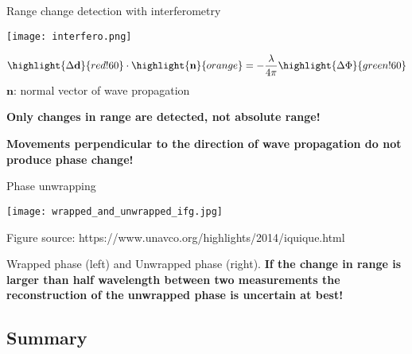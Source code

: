\documentclass[aspectratio=169]{beamer}
\newcommand{\imp}[1]{ {\Large \color{red} \textbf{#1}} }
\begin{document}
\begin{frame}{Range change detection with interferometry}

    \begin{minipage}[c]{0.45\textwidth}
        \texttt{[image: interfero.png]}
    \end{minipage}
    \hspace{15pt}
    \begin{minipage}[c]{0.45\textwidth}
        \pause
        \[
            \highlight{\Delta \mathbf{d}}{red!60} \cdot \highlight{\mathbf{n}}{orange} = - \frac{\lambda}{4 \pi} \highlight{\Delta \Phi}{green!60}
        \]
        $\mathbf{n}$: normal vector of wave propagation
        \vspace{15pt}

        \pause
        \imp{Only changes in range are detected, not absolute range!}
        \vspace{15pt}

        \pause
        \imp{Movements perpendicular to the direction of wave propagation do not produce phase change!}
    \end{minipage}
\end{frame}

\begin{frame}{Phase unwrapping}
    \pause
    \begin{minipage}[c]{0.575\textwidth}
        \centering
        \texttt{[image: wrapped\_and\_unwrapped\_ifg.jpg]}
        
        {\tiny Figure source: https://www.unavco.org/highlights/2014/iquique.html}
    \end{minipage}
    \hspace{5pt}
    \begin{minipage}[c]{0.35\textwidth}
        \pause
        Wrapped phase (left) and Unwrapped phase (right).
        \vspace{10pt}
        \pause
        \imp{If the change in range is larger than half wavelength between two
             measurements the reconstruction of the unwrapped phase is uncertain at best!}
    \end{minipage}
\end{frame}

\subsection{Summary}
\end{document}
